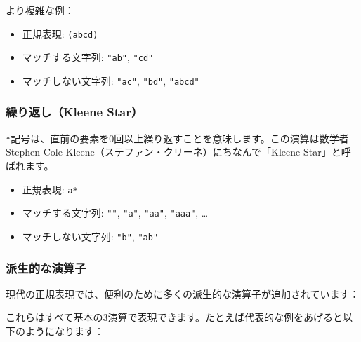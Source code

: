 より複雑な例：

\begin{itemize}
\tightlist
\item
  正規表現: \texttt{(ab\textbar{}cd)}
\item
  マッチする文字列: \texttt{"ab"}, \texttt{"cd"}
\item
  マッチしない文字列: \texttt{"ac"}, \texttt{"bd"}, \texttt{"abcd"}
\end{itemize}

\hypertarget{chapter4-ux7e70ux308aux8fd4ux3057kleene-star}{%
\subsubsection{繰り返し（Kleene Star）}\label{chapter4-ux7e70ux308aux8fd4ux3057kleene-star}}

\texttt{*}記号は、直前の要素を0回以上繰り返すことを意味します。この演算は数学者Stephen
Cole Kleene（ステファン・クリーネ）にちなんで「Kleene
Star」と呼ばれます。

\begin{itemize}
\tightlist
\item
  正規表現: \texttt{a*}
\item
  マッチする文字列: \texttt{""}, \texttt{"a"}, \texttt{"aa"},
  \texttt{"aaa"}, \ldots{}
\item
  マッチしない文字列: \texttt{"b"}, \texttt{"ab"}
\end{itemize}

\hypertarget{chapter4-ux6d3eux751fux7684ux306aux6f14ux7b97ux5b50}{%
\subsubsection{派生的な演算子}\label{chapter4-ux6d3eux751fux7684ux306aux6f14ux7b97ux5b50}}

現代の正規表現では、便利のために多くの派生的な演算子が追加されています：

\begin{Shaded}
\begin{Highlighting}[]
\end{Highlighting}
\end{Shaded}

これらはすべて基本の3演算で表現できます。たとえば代表的な例をあげると以下のようになります：

